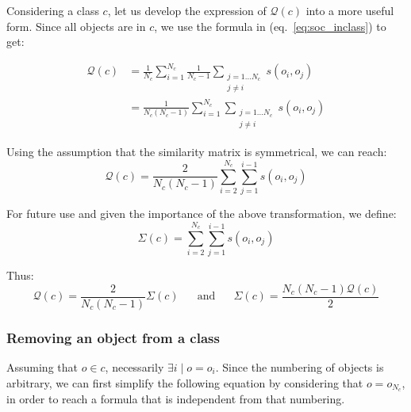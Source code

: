 \documentclass[natbib,smallextended]{svjour3}
\begin{document}
Considering a class $c$, let us develop the expression of $\mathcal{Q}(c)$ into a more useful form. Since all objects are in $c$, we use the formula in (eq.~\ref{eq:soc_inclass}) to get:

\begin{equation*}
  \begin{aligned}
    \mathcal{Q}\left(c\right) & = \frac{1}{N_c} \sum_{i=1}^{N_c} \frac{1}{N_c-1} \sum_{\substack{j=1 \ldots N_c\\j \neq i}} s\left(o_i, o_j\right) \\
                              & = \frac{1}{N_c(N_c-1)} \sum_{i=1}^{N_c} \sum_{\substack{j=1 \ldots N_c\\j \neq i}} s\left(o_i, o_j\right)
  \end{aligned}
\end{equation*}

Using the assumption that the similarity matrix is symmetrical, we can reach: %
\begin{equation}
    \mathcal{Q}\left(c\right) = \frac{2}{N_c(N_c-1)} \sum_{i=2}^{N_c} \sum_{j=1}^{i-1} s\left(o_i, o_j\right)
    \label{eq:classQuality}
\end{equation}

For future use and given the importance of the above transformation, we define:
\[
  \Sigma(c) = \sum_{i=2}^{N_c} \sum_{j=1}^{i-1} s\left(o_i, o_j\right)
\]

Thus:
\[
\mathcal{Q}\left(c\right) = \frac{2}{N_c(N_c-1)}\Sigma(c) \phantom{XX}\mathrm{and}\phantom{XX} \Sigma(c) = \frac{N_c(N_c-1)\mathcal{Q}\left(c\right)}{2}
\]

\subsubsection{Removing an object from a class}

Assuming that $o \in c$, necessarily $\exists i \mid o=o_i$. Since the numbering of objects is arbitrary, we can first simplify the following equation by considering that $o = o_{N_c}$, in order to reach a formula that is independent from that numbering.
\end{document}
